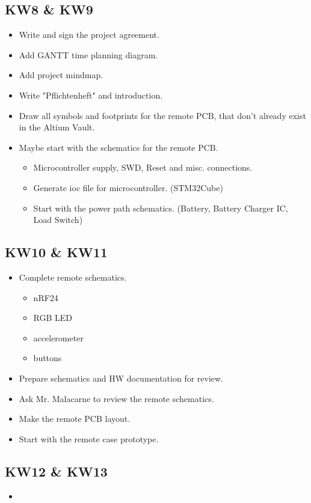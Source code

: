 \subsection{KW8 \& KW9}
\label{ssec:KW8_KW9}
\begin{itemize}
    \item Write and sign the project agreement.
    \item Add GANTT time planning diagram.
    \item Add project mindmap.
    \item Write "Pflichtenheft" and introduction.
    \item Draw all symbols and footprints for the remote PCB, that don't already exist in the Altium Vault.
    \item Maybe start with the schematics for the remote PCB.
    \begin{itemize}
        \item Microcontroller supply, SWD, Reset and misc. connections.
        \item Generate ioc file for microcontroller. (STM32Cube)
        \item Start with the power path schematics. (Battery, Battery Charger IC, Load Switch)
    \end{itemize}
\end{itemize}


\subsection{KW10 \& KW11}
\label{ssec:KW10_KW11}
\begin{itemize}
    \item Complete remote schematics.
    \begin{itemize}
        \item nRF24
        \item RGB LED
        \item accelerometer
        \item buttons
    \end{itemize}
    \item Prepare schematics and HW documentation for review.
    \item Ask Mr. Malacarne to review the remote schematics.
    \item Make the remote PCB layout.
    \item Start with the remote case prototype.
\end{itemize}


\subsection{KW12 \& KW13}
\label{ssec:KW12_KW13}
\begin{itemize}
    \item 
\end{itemize}


